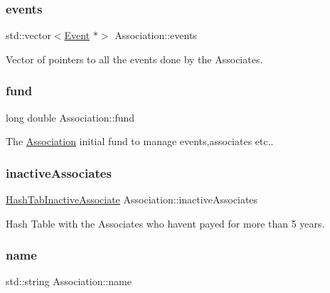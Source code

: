 \subsubsection{\texorpdfstring{events}{events}}
{\footnotesize\ttfamily std\+::vector$<$\mbox{\hyperlink{classEvent}{Event}} $\ast$$>$ Association\+::events\hspace{0.3cm}{\ttfamily [private]}}



Vector of pointers to all the events done by the Associates. 

\mbox{\label{classAssociation_a891f18ca3dbbbdfa2e8fab54b1683133}} 
\subsubsection{\texorpdfstring{fund}{fund}}
{\footnotesize\ttfamily long double Association\+::fund\hspace{0.3cm}{\ttfamily [private]}}



The \mbox{\hyperlink{classAssociation}{Association}} initial fund to manage events,associates etc.. 

\mbox{\label{classAssociation_a13bdee38cb61374825f440c6015f1846}} 
\subsubsection{\texorpdfstring{inactive\+Associates}{inactiveAssociates}}
{\footnotesize\ttfamily \mbox{\hyperlink{Association_8h_a867982abd2e9432d5bed2574754bad3c}{Hash\+Tab\+Inactive\+Associate}} Association\+::inactive\+Associates\hspace{0.3cm}{\ttfamily [private]}}



Hash Table with the Associates who haven\textquotesingle{}t payed for more than 5 years. 

\mbox{\label{classAssociation_a165477d8d99c99a659d2f193b39ba1f8}} 
\subsubsection{\texorpdfstring{name}{name}}
{\footnotesize\ttfamily std\+::string Association\+::name\hspace{0.3cm}{\ttfamily [private]}}



